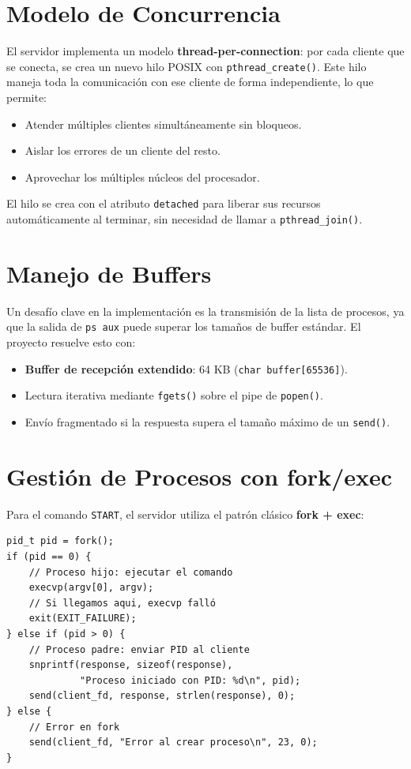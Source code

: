 \documentclass[12pt,a4paper]{report}
\begin{document}
\section{Modelo de Concurrencia}

El servidor implementa un modelo \textbf{thread-per-connection}: por cada cliente que se conecta, se crea un nuevo hilo POSIX con \texttt{pthread\_create()}. Este hilo maneja toda la comunicación con ese cliente de forma independiente, lo que permite:

\begin{itemize}[leftmargin=1.5em]
  \item Atender múltiples clientes simultáneamente sin bloqueos.
  \item Aislar los errores de un cliente del resto.
  \item Aprovechar los múltiples núcleos del procesador.
\end{itemize}

El hilo se crea con el atributo \texttt{detached} para liberar sus recursos automáticamente al terminar, sin necesidad de llamar a \texttt{pthread\_join()}.

\section{Manejo de Buffers}

Un desafío clave en la implementación es la transmisión de la lista de procesos, ya que la salida de \texttt{ps aux} puede superar los tamaños de buffer estándar. El proyecto resuelve esto con:

\begin{itemize}[leftmargin=1.5em]
  \item \textbf{Buffer de recepción extendido}: 64 KB (\texttt{char buffer[65536]}).
  \item Lectura iterativa mediante \texttt{fgets()} sobre el pipe de \texttt{popen()}.
  \item Envío fragmentado si la respuesta supera el tamaño máximo de un \texttt{send()}.
\end{itemize}

\section{Gestión de Procesos con fork/exec}

Para el comando \texttt{START}, el servidor utiliza el patrón clásico \textbf{fork + exec}:

\begin{lstlisting}[caption={Patrón fork/exec para iniciar procesos}, label={lst:forkexec}]
pid_t pid = fork();
if (pid == 0) {
    // Proceso hijo: ejecutar el comando
    execvp(argv[0], argv);
    // Si llegamos aqui, execvp falló
    exit(EXIT_FAILURE);
} else if (pid > 0) {
    // Proceso padre: enviar PID al cliente
    snprintf(response, sizeof(response),
             "Proceso iniciado con PID: %d\n", pid);
    send(client_fd, response, strlen(response), 0);
} else {
    // Error en fork
    send(client_fd, "Error al crear proceso\n", 23, 0);
}
\end{lstlisting}
\end{document}
